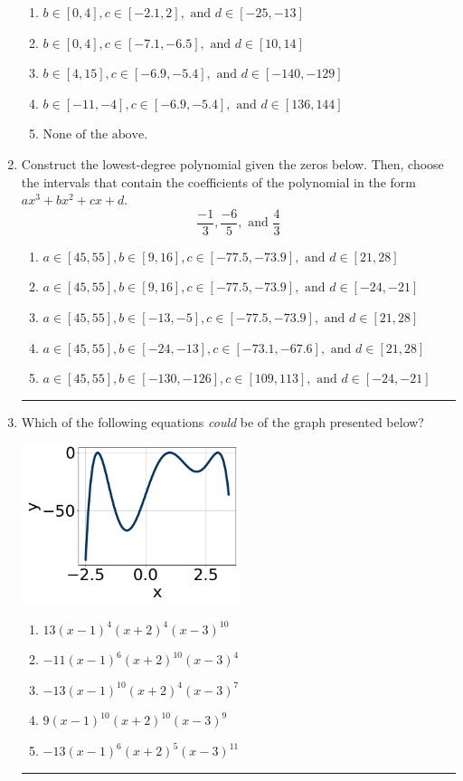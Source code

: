 \documentclass[14pt]{extbook}
\newcommand{\litem}[1]{\item#1\hspace*{-1cm}\rule{\textwidth}{0.4pt}}
\begin{document}
\begin{enumerate}
{\begin{enumerate}[label=\Alph*.]
\item \( b \in [0, 4], c \in [-2.1, 2], \text{ and } d \in [-25, -13] \)
\item \( b \in [0, 4], c \in [-7.1, -6.5], \text{ and } d \in [10, 14] \)
\item \( b \in [4, 15], c \in [-6.9, -5.4], \text{ and } d \in [-140, -129] \)
\item \( b \in [-11, -4], c \in [-6.9, -5.4], \text{ and } d \in [136, 144] \)
\item \( \text{None of the above.} \)

\end{enumerate} }
\litem{
Construct the lowest-degree polynomial given the zeros below. Then, choose the intervals that contain the coefficients of the polynomial in the form $ax^3+bx^2+cx+d$.\[ \frac{-1}{3}, \frac{-6}{5}, \text{ and } \frac{4}{3} \]\begin{enumerate}[label=\Alph*.]
\item \( a \in [45, 55], b \in [9, 16], c \in [-77.5, -73.9], \text{ and } d \in [21, 28] \)
\item \( a \in [45, 55], b \in [9, 16], c \in [-77.5, -73.9], \text{ and } d \in [-24, -21] \)
\item \( a \in [45, 55], b \in [-13, -5], c \in [-77.5, -73.9], \text{ and } d \in [21, 28] \)
\item \( a \in [45, 55], b \in [-24, -13], c \in [-73.1, -67.6], \text{ and } d \in [21, 28] \)
\item \( a \in [45, 55], b \in [-130, -126], c \in [109, 113], \text{ and } d \in [-24, -21] \)

\end{enumerate} }
\litem{
Which of the following equations \textit{could} be of the graph presented below?
\begin{center}
    \includegraphics[width=0.5\textwidth]{../Figures/polyGraphToFunctionB.png}
\end{center}
\begin{enumerate}[label=\Alph*.]
\item \( 13(x - 1)^{4} (x + 2)^{4} (x - 3)^{10} \)
\item \( -11(x - 1)^{6} (x + 2)^{10} (x - 3)^{4} \)
\item \( -13(x - 1)^{10} (x + 2)^{4} (x - 3)^{7} \)
\item \( 9(x - 1)^{10} (x + 2)^{10} (x - 3)^{9} \)
\item \( -13(x - 1)^{6} (x + 2)^{5} (x - 3)^{11} \)

\end{enumerate} }
\end{enumerate}
\end{document}
